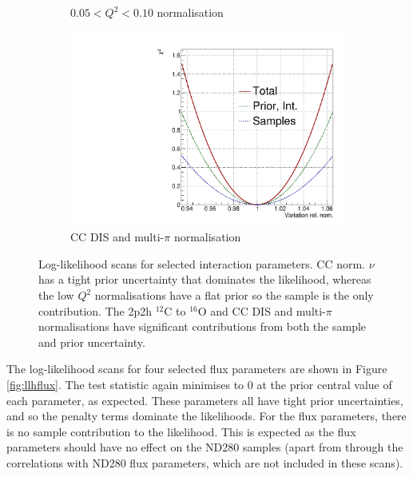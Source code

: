 \begin{figure}[!htbp]
\begin{subfigure}{.49\textwidth}
  \caption{$0.05 < Q^2 < 0.10$ normalisation}
\end{subfigure}
\begin{subfigure}{.49\textwidth}
  \centering
  \includegraphics[width=0.7\linewidth]{figs/llh/CC_DIS_MultPi_Norm_Nubar_llh.pdf}
  \caption{CC DIS and multi-$\pi$ normalisation}
\end{subfigure}
\caption{Log-likelihood scans for selected interaction parameters. CC norm. $\nu$ has a tight prior uncertainty that dominates the likelihood, whereas the low $Q^2$ normalisations have a flat prior so the sample is the only contribution. The 2p2h $^{12}$C to $^{16}$O and CC DIS and multi-$\pi$ normalisations have significant contributions from both the sample and prior uncertainty.}
\label{fig:llhxsec} 
\end{figure}

The log-likelihood scans for four selected flux parameters are shown in Figure \ref{fig:llhflux}. The test statistic again minimises to 0 at the prior central value of each parameter, as expected. These parameters all have tight prior uncertainties, and so the penalty terms dominate the likelihoods. For the \SK flux parameters, there is no sample contribution to the likelihood. This is expected as the \SK flux parameters should have no effect on the ND280 samples (apart from through the correlations with ND280 flux parameters, which are not included in these scans). 

